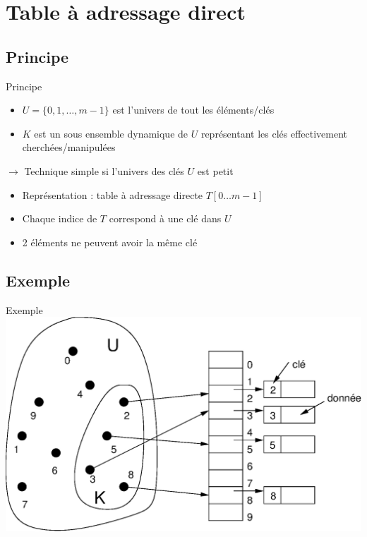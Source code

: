 \documentclass{beamer}
\begin{document}
  \section{Table à adressage direct}
  \subsection{Principe}
  \begin{frame}{Principe}
    \begin{itemize}
        \item{$U = \{0, 1, \ldots, m - 1\}$  est l'univers de tout les éléments/clés}
        \item{$K$ est un sous ensemble dynamique de $U$ représentant les clés effectivement cherchées/manipulées}
    \end{itemize}

    $\rightarrow$ Technique simple si l’univers des clés $U$ est petit

    \begin{itemize}
      \item{Représentation : table à adressage directe $T[0\ldots m - 1]$}
      \item{Chaque indice de $T$ correspond à une clé dans $U$}
      \item{2 éléments ne peuvent avoir la même clé}
    \end{itemize}


  \end{frame}

  \subsection{Exemple}
  \begin{frame}{Exemple}
    \includegraphics[width=\textwidth]{./imgs/direct}
  \end{frame}
\end{document}
